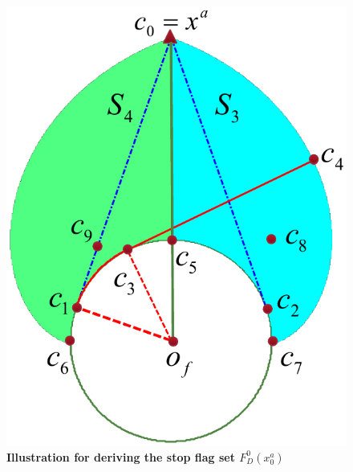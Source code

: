 \documentclass[letterpaper, 10 pt, conference]{ieeeconf}  %
\numberwithin{algorithm}{section}
\begin{document}
\begin{figure}[tbp]
	\centering
	\includegraphics[width=0.65\columnwidth]{figures/FD0}
	\caption{\textbf{Illustration for deriving the stop flag set $F_D^0(x^a_0)$}}
	\label{fig:FD0}
\end{figure}
\end{document}
